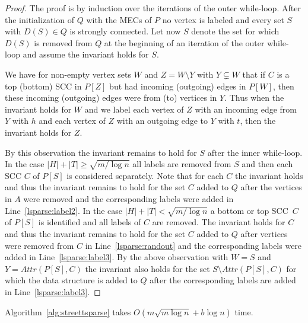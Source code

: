 \documentclass[11pt,letterpaper]{article}
\newcommand{\lu}{\textup{(}}
\newcommand{\ru}{\textup{)}\xspace}
\newcommand{\upbr}[1]{\lu #1\ru}
\newcommand{\at}{\mathit{Attr}}
\newcommand{\mdp}{P\xspace}
\newcommand{\scc}{C\xspace}
\newcommand{\ds}{\mathit{D}\xspace}
\begin{document}
\begin{proof}
	The proof is by induction over the iterations of the outer while-loop.
	After the initialization of $Q$ with the MECs of $\mdp$ no vertex is labeled
	and every set $S$ with $\ds(S) \in Q$ is strongly connected.
	Let now $S$ denote the set for which $\ds(S)$ is removed from $Q$ 
	at the beginning of an iteration of the outer while-loop and assume the 
	invariant holds for $S$.
	\begin{observation*}
	We have for non-empty vertex sets $W$ and $Z = W \setminus Y$
	with $Y \subsetneq W$ that if $C$ is a top \upbr{bottom} SCC in $\mdp[Z]$
	but had incoming \upbr{outgoing} edges in $P[W]$, then these incoming 
	\upbr{outgoing} edges were from \upbr{to} vertices in $Y$. Thus when the 
	invariant holds for $W$ and
	we label each vertex of $Z$ with an incoming edge from $Y$ with $h$ and 
	each vertex of $Z$ with an outgoing edge to $Y$ with $t$, then the invariant
	holds for $Z$.
	\end{observation*}
	By this observation the invariant remains to hold for $S$ after the inner 
	while-loop.
	In the case $\lvert H \rvert + \lvert T \rvert \ge \sqrt{m / \log n}$
	all labels are removed from $S$ and then each SCC $\scc$ of $\mdp[S]$ is 
	considered separately. Note that for each $\scc$ the invariant holds
	and thus the invariant remains to hold for the set $\scc$ added to $Q$ after 
	the vertices in $A$ were removed and the corresponding labels were added in 
	Line~\ref{lsparse:label2}.
	In the case $\lvert H \rvert + \lvert T \rvert < \sqrt{m / \log n}$
	a bottom or top SCC~$\scc$ of $\mdp[S]$ is identified and all labels
	of $\scc$ are removed. The invariant holds for $\scc$ and thus the invariant remains 
	to hold for the set $\scc$ added to $Q$ after 
	vertices were removed from $\scc$ in Line~\ref{lsparse:randout}
	and the corresponding labels were added in Line~\ref{lsparse:label3}.
	By the above observation with $W = S$ and $Y = \at(\mdp[S], \scc)$
	the invariant also holds for the set $S \setminus \at(\mdp[S], \scc)$
	for which the data structure is added to $Q$ after the corresponding
	labels are added in Line~\ref{lsparse:label3}.
\end{proof}

\begin{proposition}
	Algorithm~\ref{alg:streettsparse} takes $O(m \sqrt{m \log n} + b \log n)$ time.
\end{proposition}
\end{document}
